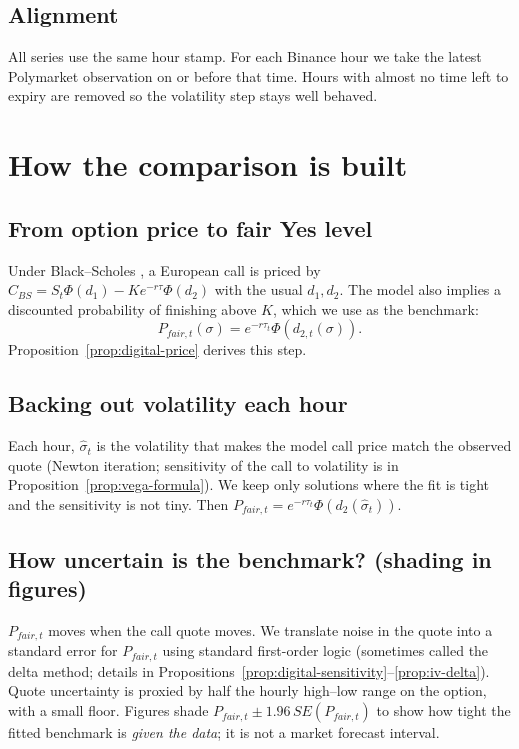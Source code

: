\documentclass[11pt]{article}
\numberwithin{equation}{section}
\theoremstyle{plain}
\begin{document}
\subsection{Alignment}
All series use the same hour stamp. For each Binance hour we take the latest Polymarket observation on or before that time. Hours with almost no time left to expiry are removed so the volatility step stays well behaved.

\section{How the comparison is built}\label{sec:model}
\subsection{From option price to fair Yes level}
Under Black--Scholes \citep{black1973}, a European call is priced by $C_{BS}=S_t\Phi(d_1)-Ke^{-r\tau}\Phi(d_2)$ with the usual $d_1,d_2$. The model also implies a discounted probability of finishing above $K$, which we use as the benchmark:
\[
P_{fair,t}(\sigma)=e^{-r\tau_t}\Phi(d_{2,t}(\sigma)).
\]
Proposition~\ref{prop:digital-price} derives this step.

\subsection{Backing out volatility each hour}
Each hour, $\hat{\sigma}_t$ is the volatility that makes the model call price match the observed quote (Newton iteration; sensitivity of the call to volatility is in Proposition~\ref{prop:vega-formula}). We keep only solutions where the fit is tight and the sensitivity is not tiny. Then $P_{fair,t}=e^{-r\tau_t}\Phi(d_2(\hat{\sigma}_t))$.

\subsection{How uncertain is the benchmark? (shading in figures)}
$P_{fair,t}$ moves when the call quote moves. We translate noise in the quote into a standard error for $P_{fair,t}$ using standard first-order logic (sometimes called the delta method; details in Propositions~\ref{prop:digital-sensitivity}--\ref{prop:iv-delta}). Quote uncertainty is proxied by half the hourly high--low range on the option, with a small floor. Figures shade $P_{fair,t}\pm 1.96\,SE(P_{fair,t})$ to show how tight the fitted benchmark is \emph{given the data}; it is not a market forecast interval.
\end{document}
